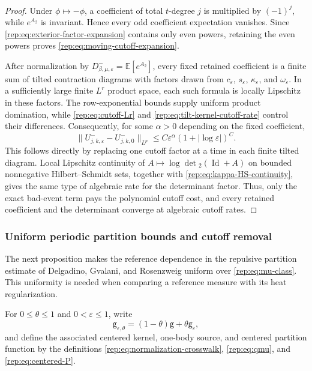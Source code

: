\documentclass[11pt,reqno]{amsart}
\numberwithin{equation}{section}
\theoremstyle{plain}
\theoremstyle{definition}
\newcommand{\E}{\mathbb E}
\newcommand{\Id}{\operatorname{Id}}
\newcommand{\be}{\beta}
\newcommand{\vep}{\varepsilon}
\newcommand{\g}{\mathsf g}
\begin{document}
\begin{proof}
Under $\phi\mapsto-\phi$, a coefficient of total $t$-degree $j$ is multiplied by $(-1)^j$, while $e^{A_2}$ is invariant.  Hence every odd coefficient expectation vanishes.  Since \eqref{rep:eq:exterior-factor-expansion} contains only even powers, retaining the even powers proves \eqref{rep:eq:moving-cutoff-expansion}.

After normalization by $D^-_{\be,\mu,\vep}=\E[e^{A_2}]$, every fixed retained coefficient is a finite sum of tilted contraction diagrams with factors drawn from $c_\vep$, $s_\vep$, $\kappa_\vep$, and $\omega_\vep$.  In a sufficiently large finite $L^r$ product space, each such formula is locally Lipschitz in these factors.  The row-exponential bounds supply uniform product domination, while \eqref{rep:eq:cutoff-Lr} and \eqref{rep:eq:tilt-kernel-cutoff-rate} control their differences.  Consequently, for some $\alpha>0$ depending on the fixed coefficient,
\begin{equation}\label{rep:eq:coefficient-cutoff-rate}
 \|U^-_{j,k,\vep}-U^-_{j,k,0}\|_{L^p}
 \le C\vep^\alpha(1+|\log\vep|)^C.
\end{equation}
This follows directly by replacing one cutoff factor at a time in each finite tilted diagram.  Local Lipschitz continuity of $A\mapsto\log\det{}_2(\Id+A)$ on bounded nonnegative Hilbert--Schmidt sets, together with \eqref{rep:eq:kappa-HS-continuity}, gives the same type of algebraic rate for the determinant factor.  Thus, only the exact bad-event term pays the polynomial cutoff cost, and every retained coefficient and the determinant converge at algebraic cutoff rates.
\end{proof}

\subsubsection{Uniform periodic partition bounds and cutoff removal}

The next proposition makes the reference dependence in the repulsive partition estimate of Delgadino, Gvalani, and Rosenzweig \cite{DelgadinoGvalaniRosenzweig2026} uniform over \eqref{rep:eq:mu-class}. This uniformity is needed when comparing a reference measure with its heat regularization.

For $0\le\theta\le1$ and $0<\vep\le1$, write
\begin{equation}\label{rep:eq:interpolated-kernel-routeI}
 \g_{\vep,\theta}=(1-\theta)\g+\theta \g_\vep,
\end{equation}
and define the associated centered kernel, one-body source, and centered partition function by the definitions \eqref{rep:eq:normalization-crosswalk}, \eqref{rep:eq:qmu}, and \eqref{rep:eq:centered-P}.
\end{document}
